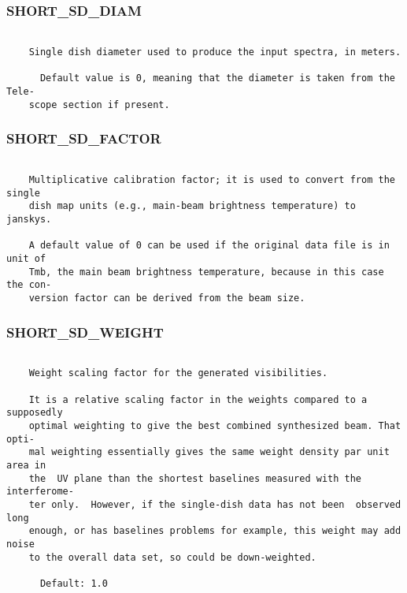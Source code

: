 \subsubsection{SHORT\_SD\_DIAM}
\begin{verbatim}

    Single dish diameter used to produce the input spectra, in meters.

      Default value is 0, meaning that the diameter is taken from the  Tele-
    scope section if present.

\end{verbatim}
\subsubsection{SHORT\_SD\_FACTOR}
\begin{verbatim}

    Multiplicative calibration factor; it is used to convert from the single
    dish map units (e.g., main-beam brightness temperature) to janskys.

    A default value of 0 can be used if the original data file is in unit of
    Tmb, the main beam brightness temperature, because in this case the con-
    version factor can be derived from the beam size.

\end{verbatim}
\subsubsection{SHORT\_SD\_WEIGHT}
\begin{verbatim}

    Weight scaling factor for the generated visibilities.

    It is a relative scaling factor in the weights compared to a  supposedly
    optimal weighting to give the best combined synthesized beam. That opti-
    mal weighting essentially gives the same weight density par unit area in
    the  UV plane than the shortest baselines measured with the interferome-
    ter only.  However, if the single-dish data has not been  observed  long
    enough, or has baselines problems for example, this weight may add noise
    to the overall data set, so could be down-weighted.

      Default: 1.0

\end{verbatim}
